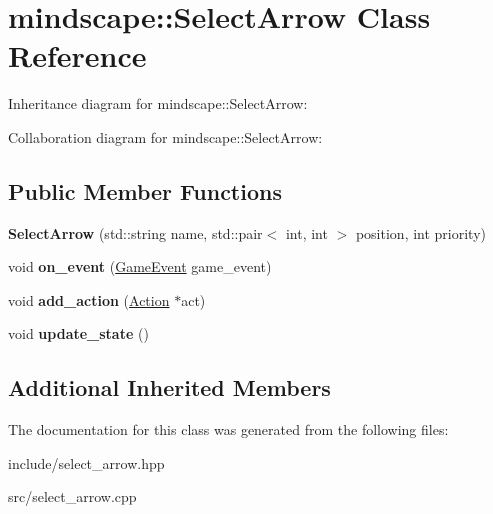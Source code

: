 \hypertarget{classmindscape_1_1_select_arrow}{}\section{mindscape\+:\+:Select\+Arrow Class Reference}
\label{classmindscape_1_1_select_arrow}


Inheritance diagram for mindscape\+:\+:Select\+Arrow\+:


Collaboration diagram for mindscape\+:\+:Select\+Arrow\+:
\subsection*{Public Member Functions}
\begin{DoxyCompactItemize}
\item 
{\bfseries Select\+Arrow} (std\+::string name, std\+::pair$<$ int, int $>$ position, int priority)\hypertarget{classmindscape_1_1_select_arrow_ad6b1089e4898188b678b0f443781ced4}{}\label{classmindscape_1_1_select_arrow_ad6b1089e4898188b678b0f443781ced4}

\item 
void {\bfseries on\+\_\+event} (\hyperlink{class_game_event}{Game\+Event} game\+\_\+event)\hypertarget{classmindscape_1_1_select_arrow_aa9087f1fd52219fd23ad2cbdf717ca69}{}\label{classmindscape_1_1_select_arrow_aa9087f1fd52219fd23ad2cbdf717ca69}

\item 
void {\bfseries add\+\_\+action} (\hyperlink{classmindscape_1_1_action}{Action} $\ast$act)\hypertarget{classmindscape_1_1_select_arrow_ab5cb745951fc1522112f4586b66a0c96}{}\label{classmindscape_1_1_select_arrow_ab5cb745951fc1522112f4586b66a0c96}

\item 
void {\bfseries update\+\_\+state} ()\hypertarget{classmindscape_1_1_select_arrow_a25e2956765898f2e9273df5704fe5973}{}\label{classmindscape_1_1_select_arrow_a25e2956765898f2e9273df5704fe5973}

\end{DoxyCompactItemize}
\subsection*{Additional Inherited Members}


The documentation for this class was generated from the following files\+:\begin{DoxyCompactItemize}
\item 
include/select\+\_\+arrow.\+hpp\item 
src/select\+\_\+arrow.\+cpp\end{DoxyCompactItemize}
